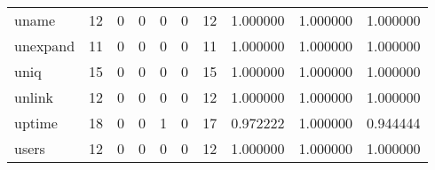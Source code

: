\begin{tabular}{lrrrrrrrrr}
uname     &                                      12 &                                                  0 &                                                  0 &                                                  0 &                                                  0 &                                                 12 &                                           1.000000 &                               1.000000 &                             1.000000 \\
unexpand  &                                      11 &                                                  0 &                                                  0 &                                                  0 &                                                  0 &                                                 11 &                                           1.000000 &                               1.000000 &                             1.000000 \\
uniq      &                                      15 &                                                  0 &                                                  0 &                                                  0 &                                                  0 &                                                 15 &                                           1.000000 &                               1.000000 &                             1.000000 \\
unlink    &                                      12 &                                                  0 &                                                  0 &                                                  0 &                                                  0 &                                                 12 &                                           1.000000 &                               1.000000 &                             1.000000 \\
uptime    &                                      18 &                                                  0 &                                                  0 &                                                  1 &                                                  0 &                                                 17 &                                           0.972222 &                               1.000000 &                             0.944444 \\
users     &                                      12 &                                                  0 &                                                  0 &                                                  0 &                                                  0 &                                                 12 &                                           1.000000 &                               1.000000 &                             1.000000 \\

\end{tabular}

